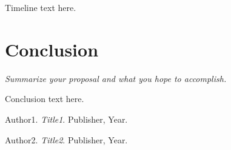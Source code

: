 \documentclass[11pt, oneside]{article}   	%
\begin{document}
Timeline text here.

\section*{Conclusion}

\textit{Summarize your proposal and what you hope to accomplish.}

Conclusion text here.

\begin{thebibliography}{9}

Author1. 
\textit{Title1}.
Publisher, Year.

Author2. 
\textit{Title2}.
Publisher, Year.

\end{thebibliography}
\end{document}
